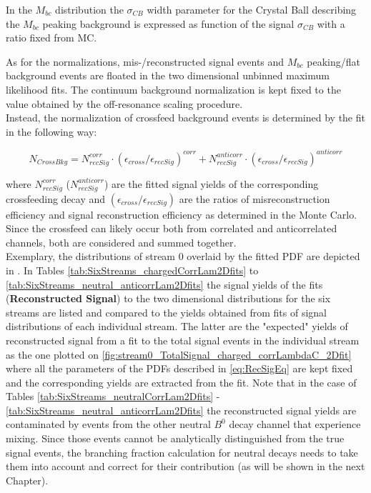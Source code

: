 \noindent In the $M_{bc}$ distribution the $\sigma_{CB}$ width parameter for the Crystal Ball describing the $M_{bc}$ peaking background is expressed as function of the signal $\sigma_{CB}$  with a ratio fixed from MC.

\noindent As for the normalizations, mis-/reconstructed signal events  and  $M_{bc}$ peaking/flat background events are floated in the two dimensional unbinned maximum likelihood fits. 
The continuum background normalization is kept fixed to the value obtained by the off-resonance scaling procedure. \\
Instead, the normalization of crossfeed background events is determined by the fit in the following way:

\begin{equation}
N_{CrossBkg} =  N_{recSig}^{corr} \cdot (\epsilon_{cross}/\epsilon_{recSig})^{corr} + N_{recSig}^{anticorr} \cdot (\epsilon_{cross}/\epsilon_{recSig})^{anticorr}  
\label{eq:paramCrossfeedNorm}
\end{equation}

where $N_{recSig}^{corr}$ ($N_{recSig}^{anticorr}$) are the fitted signal yields of the corresponding crossfeeding decay and $ (\epsilon_{cross}/\epsilon_{recSig})$ are the ratios of misreconstruction efficiency and signal reconstruction efficiency as determined in the Monte Carlo.
Since the crossfeed can likely occur both from correlated and anticorrelated channels, both are considered and summed together.\\
Exemplary, the distributions of stream 0 overlaid by the fitted PDF are depicted in .
In Tables \ref{tab:SixStreams_chargedCorrLam2Dfits} to \ref{tab:SixStreams_neutral_anticorrLam2Dfits}  the signal yields of the fits (\textbf{Reconstructed Signal}) to the two dimensional distributions for the six streams are listed and compared
to the yields obtained from fits of signal distributions of each individual stream. The latter are the "expected" yields of reconstructed signal from a fit to the total signal events in the individual
stream as the one plotted on \cref{fig:stream0_TotalSignal_charged_corrLambdaC_2Dfit} where all the parameters of the PDFs described in \cref{eq:RecSigEq} are kept fixed and the corresponding yields are extracted from the fit. 
Note that in the case of Tables \cref{tab:SixStreams_neutralCorrLam2Dfits} - \ref{tab:SixStreams_neutral_anticorrLam2Dfits}  the reconstructed signal yields are contaminated by events from the other neutral $B^0$ decay channel
 that experience mixing. Since those events cannot be analytically distinguished from the true signal events, the branching fraction calculation for neutral decays needs to take them into account and correct for their contribution 
 (as will be shown in the next Chapter).


